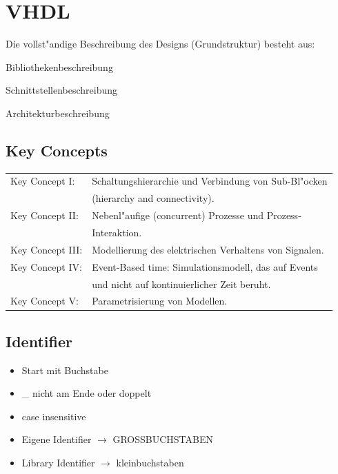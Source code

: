 \vspace{\baselineskip}
\begin{minipage}[t]{0.59\textwidth}
	\section{VHDL}
	Die vollst"andige Beschreibung des Designs (Grundstruktur) besteht aus:
	\begin{description}
	\setlength{\itemsep}{0pt}
  	\setlength{\parskip}{0pt}
  	\setlength{\parsep}{0pt}
		\item [library:] Bibliothekenbeschreibung
		\item [entity:] Schnittstellenbeschreibung
		\item [architecture:] Architekturbeschreibung
	\end{description}
	\subsection{Key Concepts}
	\begin{tabular}{ll}
		Key Concept I: & Schaltungshierarchie und Verbindung von Sub-Bl"ocken\\
		& (hierarchy and connectivity).\\
		Key Concept II: & Nebenl"aufige (concurrent) Prozesse und Prozess-\\
		& Interaktion.\\
		Key Concept III: & Modellierung des elektrischen Verhaltens von Signalen.\\
		Key Concept IV: & Event-Based time: Simulationsmodell, das auf Events\\
		& und nicht auf kontinuierlicher Zeit beruht.\\
		Key Concept V: & Parametrisierung von Modellen.
	\end{tabular}
\end{minipage}
\begin{minipage}[t]{0.3\textwidth}
\subsection{Identifier}
		\begin{itemize}
			\setlength{\itemsep}{0pt}
  			\setlength{\parskip}{0pt}
  			\setlength{\parsep}{0pt}
				\item Start mit Buchstabe
				\item \_ nicht am Ende oder doppelt
				\item case insensitive
				\item Eigene Identifier $\rightarrow$ GROSSBUCHSTABEN
				\item Library Identifier $\rightarrow$ kleinbuchstaben
		\end{itemize}
		\vfill\null
\end{minipage}
	
